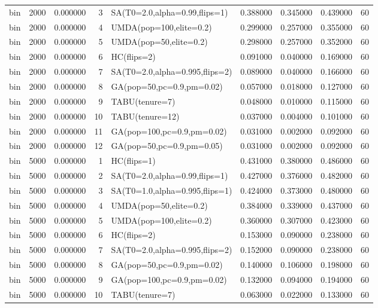 \begin{longtable}{lrrrlrrrr}
bin & 2000 & 0.000000 & 3 & SA(T0=2.0,alpha=0.99,flips=1) & 0.388000 & 0.345000 & 0.439000 & 60 \\
bin & 2000 & 0.000000 & 4 & UMDA(pop=100,elite=0.2) & 0.299000 & 0.257000 & 0.355000 & 60 \\
bin & 2000 & 0.000000 & 5 & UMDA(pop=50,elite=0.2) & 0.298000 & 0.257000 & 0.352000 & 60 \\
bin & 2000 & 0.000000 & 6 & HC(flips=2) & 0.091000 & 0.040000 & 0.169000 & 60 \\
bin & 2000 & 0.000000 & 7 & SA(T0=2.0,alpha=0.995,flips=2) & 0.089000 & 0.040000 & 0.166000 & 60 \\
bin & 2000 & 0.000000 & 8 & GA(pop=50,pc=0.9,pm=0.02) & 0.057000 & 0.018000 & 0.127000 & 60 \\
bin & 2000 & 0.000000 & 9 & TABU(tenure=7) & 0.048000 & 0.010000 & 0.115000 & 60 \\
bin & 2000 & 0.000000 & 10 & TABU(tenure=12) & 0.037000 & 0.004000 & 0.101000 & 60 \\
bin & 2000 & 0.000000 & 11 & GA(pop=100,pc=0.9,pm=0.02) & 0.031000 & 0.002000 & 0.092000 & 60 \\
bin & 2000 & 0.000000 & 12 & GA(pop=50,pc=0.9,pm=0.05) & 0.031000 & 0.002000 & 0.092000 & 60 \\
bin & 5000 & 0.000000 & 1 & HC(flips=1) & 0.431000 & 0.380000 & 0.486000 & 60 \\
bin & 5000 & 0.000000 & 2 & SA(T0=2.0,alpha=0.99,flips=1) & 0.427000 & 0.376000 & 0.482000 & 60 \\
bin & 5000 & 0.000000 & 3 & SA(T0=1.0,alpha=0.995,flips=1) & 0.424000 & 0.373000 & 0.480000 & 60 \\
bin & 5000 & 0.000000 & 4 & UMDA(pop=50,elite=0.2) & 0.384000 & 0.339000 & 0.437000 & 60 \\
bin & 5000 & 0.000000 & 5 & UMDA(pop=100,elite=0.2) & 0.360000 & 0.307000 & 0.423000 & 60 \\
bin & 5000 & 0.000000 & 6 & HC(flips=2) & 0.153000 & 0.090000 & 0.238000 & 60 \\
bin & 5000 & 0.000000 & 7 & SA(T0=2.0,alpha=0.995,flips=2) & 0.152000 & 0.090000 & 0.238000 & 60 \\
bin & 5000 & 0.000000 & 8 & GA(pop=50,pc=0.9,pm=0.02) & 0.140000 & 0.106000 & 0.198000 & 60 \\
bin & 5000 & 0.000000 & 9 & GA(pop=100,pc=0.9,pm=0.02) & 0.132000 & 0.094000 & 0.194000 & 60 \\
bin & 5000 & 0.000000 & 10 & TABU(tenure=7) & 0.063000 & 0.022000 & 0.133000 & 60 \\

\end{longtable}
